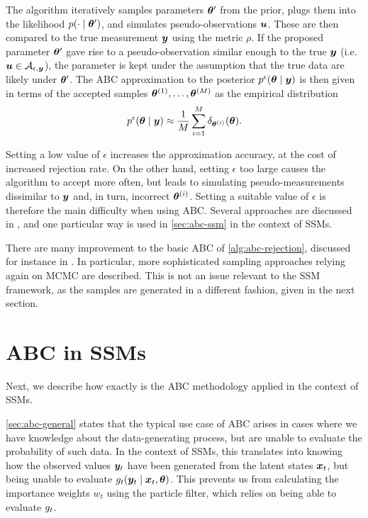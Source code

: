 The algorithm iteratively samples parameters $\bm{\theta}^\prime$ from the prior, plugs them into the likelihood $p(\cdot \mid \bm{\theta}^\prime)$, and simulates pseudo-observations $\bm{u}$. These are then compared to the true measurement $\bm{y}$ using the metric $\rho$. If the proposed parameter $\bm{\theta}^\prime$ gave rise to a pseudo-observation similar enough to the true $\bm{y}$ (i.e. $\bm{u} \in \mathcal{A}_{\epsilon, \bm{y}}$), the parameter is kept under the assumption that the true data are likely under $\bm{\theta}^\prime$. The ABC approximation to the posterior $p^\epsilon(\bm{\theta} \mid \bm{y})$ is then given in terms of the accepted samples $\bm{\theta}^{(1)}, \ldots, \bm{\theta}^{(M)}$ as the empirical distribution
\begin{equation*}
p^\epsilon(\bm{\theta} \mid \bm{y}) \approx \frac{1}{M} \sum_{i=1}^M \delta_{\bm{\theta}^{(i)}}(\bm{\theta}).
\end{equation*}

Setting a low value of $\epsilon$ increases the approximation accuracy, at the cost of increased rejection rate. On the other hand, setting $\epsilon$ too large causes the algorithm to accept more often, but leads to simulating pseudo-measurements dissimilar to $\bm{y}$ and, in turn, incorrect $\bm{\theta}^{(i)}$. Setting a suitable value of $\epsilon$ is therefore the main difficulty when using ABC. Several approaches are discussed in \cite{jasra-filtering, jasra-time-series}, and one particular way \citep{dedecius} is used in \autoref{sec:abc-ssm} in the context of SSMs.

There are many improvement to the basic ABC of \autoref{alg:abc-rejection}, discussed for instance in \cite{abc-recent}. In particular, more sophisticated sampling approaches relying again on MCMC are described. This is not an issue relevant to the SSM framework, as the samples are generated in a different fashion, given in the next section.

\section{ABC in SSMs} \label{sec:abc-ssm}
Next, we describe how exactly is the ABC methodology applied in the context of SSMs.

\autoref{sec:abc-general} states that the typical use case of ABC arises in cases where we have knowledge about the data-generating process, but are unable to evaluate the probability of such data. In the context of SSMs, this translates into knowing how the observed values $\bm{y}_t$ have been generated from the latent states $\bm{x}_t$, but being unable to evaluate $g_t(\bm{y}_t \mid \bm{x}_t, \bm{\theta})$. This prevents us from calculating the importance weights $w_t$ using the particle filter, which relies on being able to evaluate $g_t$.


